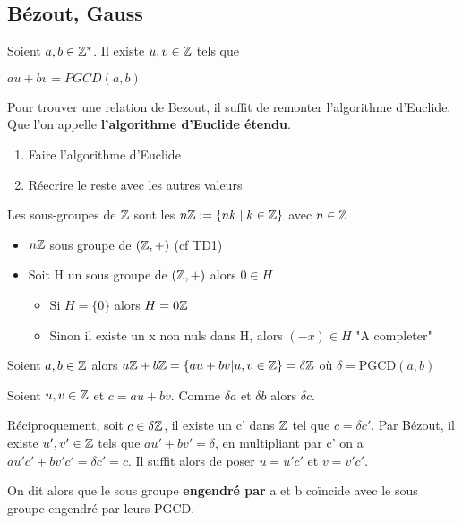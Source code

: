 \documentclass[a4paper, 12pt]{article}
\begin{document}
\subsection{Bézout, Gauss}

\begin{proposition}[Bézout]
    Soient $a, b \in \mathbb{Z}^*$. Il existe $u, v \in \mathbb{Z}$ tels que

    $au + bv = PGCD(a, b)$
\end{proposition}

\begin{methode}
    Pour trouver une relation de Bezout, il suffit de remonter l'algorithme d'Euclide. Que l'on
    appelle \textbf{l'algorithme d'Euclide étendu}.

    \begin{enumerate}
        \item Faire l'algorithme d'Euclide
        \item Réecrire le reste avec les autres valeurs
    \end{enumerate}
\end{methode}

\begin{lemme}
    Les sous-groupes de $\mathbb{Z}$ sont les $n\mathbb{Z} := \{nk \mid k \in \mathbb{Z}\}$ avec $n \in \mathbb{Z}$
\end{lemme}

\begin{demonstration}
    \begin{itemize}
        \item $n\mathbb{Z}$ sous groupe de $(\mathbb{Z}, +)$ (cf TD1)
        \item Soit H un sous groupe de $(\mathbb{Z}, +)$ alors $0 \in H$
        \begin{itemize}
            \item Si $H = \{0\}$ alors $H = 0\mathbb{Z}$
            \item Sinon il existe un x non nuls dans H, alors $(-x) \in H$ "A completer"
        \end{itemize}
    \end{itemize}
\end{demonstration}

\begin{corollaire}
    Soient $a, b \in \mathbb{Z}$ alors $a\mathbb{Z} + b\mathbb{Z} = \{au + bv | u, v \in \mathbb{Z}\} = \delta \mathbb{Z}$ où $\delta = \mathrm{PGCD}(a, b)$
\end{corollaire}

\begin{demonstration}
    Soient $u, v \in \mathbb{Z}$ et $c = au + bv$. Comme $\delta a$ et $\delta b$ alors $\delta c$.

    Réciproquement, soit $c \in \delta\mathbb{Z}$, il existe un c' dans $\mathbb{Z}$ tel que $c = \delta c'$. Par Bézout, il existe
    $u', v' \in \mathbb{Z}$ tels que $au' + bv' = \delta$, en multipliant par c' on a $au'c' + bv'c' = \delta c' = c$. Il suffit alors
    de poser $u = u'c'$ et $v = v'c'$.

    On dit alors que le sous groupe \textbf{engendré par} a et b coïncide avec le sous groupe engendré par leurs PGCD.
\end{demonstration}
\end{document}
